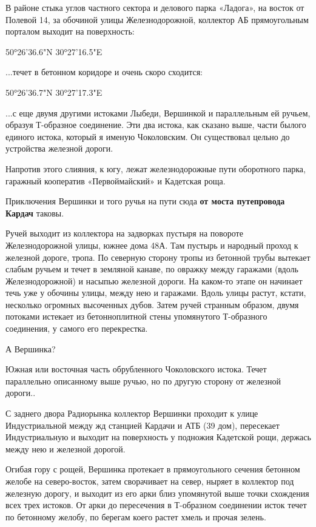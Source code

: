 В районе стыка углов частного сектора и делового парка «Ладога», на восток от Полевой 14, за обочиной улицы Железнодорожной, коллектор АБ прямоугольным порталом выходит на поверхность:

50°26'36.6"N 30°27'16.5"E

...течет в бетонном коридоре и очень скоро сходится:

50°26'36.7"N 30°27'17.3"E

...с еще двумя другими истоками Лыбеди, Вершинкой и параллельным ей ручьем, образуя Т-образное соединение. Эти два истока, как сказано выше, части былого единого истока, который я именую Чоколовским. Он существовал цельно до устройства железной дороги.

Напротив этого слияния, к югу, лежат железнодорожные пути оборотного парка, гаражный кооператив «Первоймайский» и Кадетская роща.

Приключения Вершинки и того ручья на пути сюда \textbf{от моста путепровода Кардач} таковы.

Ручей выходит из коллектора на задворках пустыря на повороте Железнодорожной улицы, южнее дома 48А. Там пустырь и народный проход к железной дороге, тропа. По северную сторону тропы из бетонной трубы вытекает слабым ручьем и течет в земляной канаве, по овражку между гаражами (вдоль Железнодорожной) и насыпью железной дороги. На каком-то этапе он начинает течь уже у обочины улицы, между нею и гаражами. Вдоль улицы растут, кстати, несколько огромных высоченных дубов. Затем ручей странным образом, двумя потоками истекает из бетонноплитной стены упомянутого Т-образного соединения, у самого его перекрестка.

А Вершинка?

Южная или восточная часть обрубленного Чоколовского истока. Течет параллельно описанному выше ручью, но по другую сторону от железной дороги.. %

С заднего двора Радиорынка коллектор Вершинки проходит к улице Индустриальной между жд станцией Кардачи и АТБ (39 дом), пересекает Индустриальную и выходит на поверхность у подножия Кадетской рощи, держась между нею и железной дорогой.

Огибая гору с рощей, Вершинка протекает в прямоугольного сечения бетонном желобе на северо-восток, затем сворачивает на север, ныряет в коллектор под железную дорогу, и выходит из его арки близ упомянутой выше точки схождения всех трех истоков. От арки до пересечения в Т-образном соединении исток течет по бетонному желобу, по берегам коего растет хмель и прочая зелень.

